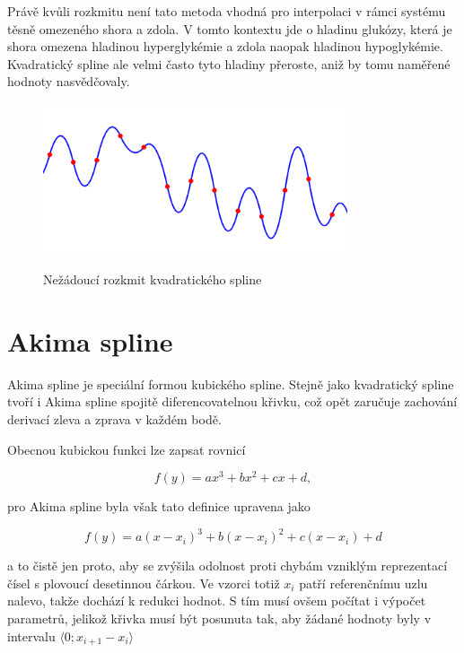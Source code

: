 \documentclass[]{thesiskiv}
\begin{document}
Právě kvůli rozkmitu není tato metoda vhodná pro interpolaci v rámci systému těsně omezeného shora a zdola. V tomto kontextu jde o hladinu glukózy, která je shora omezena hladinou hyperglykémie a zdola naopak hladinou hypoglykémie. Kvadratický spline ale velmi často tyto hladiny přeroste, aniž by tomu naměřené hodnoty nasvědčovaly.

\begin{figure}[ht]
	\centering
	\includegraphics[width=0.8\textwidth]{img/rozkmit.png}\label{img:rozkmit}
	\caption{Nežádoucí rozkmit kvadratického spline}
\end{figure}

\section{Akima spline}

Akima spline je speciální formou kubického spline. Stejně jako kvadratický spline tvoří i Akima spline spojitě diferencovatelnou křivku, což opět zaručuje zachování derivací zleva a zprava v každém bodě.

Obecnou kubickou funkci lze zapsat rovnicí

\begin{equation}
f(y)=ax^3+bx^2+cx+d,
\end{equation}

pro Akima spline byla však tato definice upravena jako

\begin{equation}
f(y)=a(x-x_i)^3+b(x-x_i)^2+c(x-x_i)+d
\end{equation}

a to čistě jen proto, aby se zvýšila odolnost proti chybám vzniklým reprezentací čísel s plovoucí desetinnou čárkou. Ve vzorci totiž $x_i$ patří referenčnímu uzlu nalevo, takže dochází k redukci hodnot. S tím musí ovšem počítat i výpočet parametrů, jelikož křivka musí být posunuta tak, aby žádané hodnoty byly v intervalu $\langle0 ; x_{i+1} - x_i \rangle$
\end{document}
